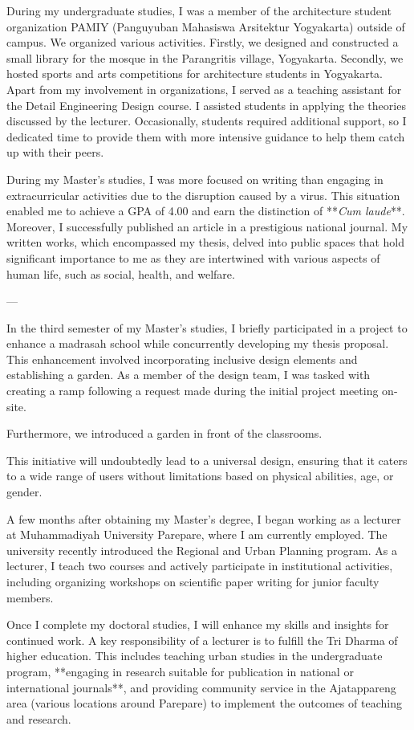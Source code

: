 \documentclass[../main.tex]{subfiles}
\begin{document}
During my undergraduate studies, I was a member of the architecture student organization PAMIY (Panguyuban Mahasiswa Arsitektur Yogyakarta) outside of campus. We organized various activities. Firstly, we designed and constructed a small library for the mosque in the Parangritis village, Yogyakarta. Secondly, we hosted sports and arts competitions for architecture students in Yogyakarta. Apart from my involvement in organizations, I served as a teaching assistant for the Detail Engineering Design course. I assisted students in applying the theories discussed by the lecturer. Occasionally, students required additional support, so I dedicated time to provide them with more intensive guidance to help them catch up with their peers.

During my Master's studies, I was more focused on writing than engaging in extracurricular activities due to the disruption caused by a virus. This situation enabled me to achieve a GPA of 4.00 and earn the distinction of **\textit{Cum laude}**. Moreover, I successfully published an article in a prestigious national journal. My written works, which encompassed my thesis, delved into public spaces that hold significant importance to me as they are intertwined with various aspects of human life, such as social, health, and welfare.

---

In the third semester of my Master's studies, I briefly participated in a project to enhance a madrasah school while concurrently developing my thesis proposal.
This enhancement involved incorporating inclusive design elements and establishing a garden.
As a member of the design team, I was tasked with creating a ramp following a request made during the initial project meeting on-site.

Furthermore, we introduced a garden in front of the classrooms.

This initiative will undoubtedly lead to a universal design, ensuring that it caters to a wide range of users without limitations based on physical abilities, age, or gender.

A few months after obtaining my Master's degree, I began working as a lecturer at Muhammadiyah University Parepare, where I am currently employed. The university recently introduced the Regional and Urban Planning program. As a lecturer, I teach two courses and actively participate in institutional activities, including organizing workshops on scientific paper writing for junior faculty members.

Once I complete my doctoral studies, I will enhance my skills and insights for continued work. A key responsibility of a lecturer is to fulfill the Tri Dharma of higher education. This includes teaching urban studies in the undergraduate program, **engaging in research suitable for publication in national or international journals**, and providing community service in the Ajatappareng area (various locations around Parepare) to implement the outcomes of teaching and research.
\end{document}
